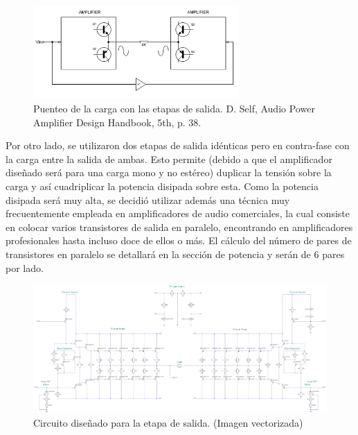 \begin{figure}[H]
\centering
	\includegraphics[width=0.7\textwidth]{ImagenesOutput-Stage/pag38-bridge_2.png}
	\caption{Puenteo de la carga con las etapas de salida. D. Self, Audio Power Amplifier Design Handbook, 5th, p. 38.}
	\label{fig:bridge}
\end{figure}

Por otro lado, se utilizaron dos etapas de salida idénticas pero en contra-fase con la carga entre la salida de ambas. Esto permite (debido a que el amplificador diseñado será para una carga mono y no estéreo) duplicar la tensión sobre la carga y así cuadriplicar la potencia disipada sobre esta.
Como la potencia disipada será muy alta, se decidió utilizar además una técnica muy frecuentemente empleada en amplificadores de audio comerciales, la cual consiste en colocar varios transistores de salida en paralelo, encontrando en amplificadores profesionales hasta incluso doce de ellos o más. El cálculo del número de pares de transistores en paralelo se detallará en la sección de potencia y serán de 6 pares por lado.

\begin{figure}[H]
 \hspace{-1cm}
	\includegraphics[width=1.1\textwidth]{TEX2.pdf}
	\caption{Circuito diseñado para la etapa de salida. (Imagen vectorizada)}
	\label{fig:output}
\end{figure}

